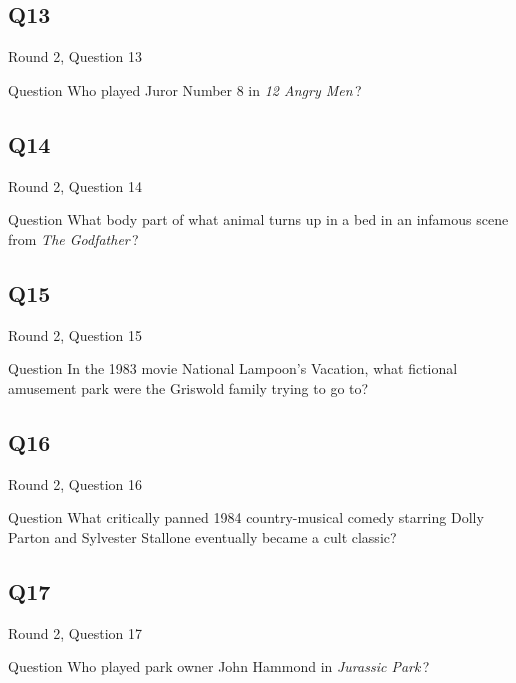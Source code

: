 \documentclass[11pt]{beamer}
\begin{document}
\subsection*{Q13}
\begin{frame}[t]{Round 2, Question 13}
\vspace{2em}
\begin{block}{Question}
Who played Juror Number 8 in \emph{12 Angry Men}\,?
\end{block}
\end{frame}
    

\subsection*{Q14}
\begin{frame}[t]{Round 2, Question 14}
\vspace{2em}
\begin{block}{Question}
What body part of what animal turns up in a bed in an infamous scene from \emph{The Godfather}\,?
\end{block}
\end{frame}
    

\subsection*{Q15}
\begin{frame}[t]{Round 2, Question 15}
\vspace{2em}
\begin{block}{Question}
In the 1983 movie National Lampoon's Vacation, what fictional amusement park were the Griswold family trying to go to?
\end{block}
\end{frame}
    

\subsection*{Q16}
\begin{frame}[t]{Round 2, Question 16}
\vspace{2em}
\begin{block}{Question}
What critically panned 1984 country-musical comedy starring Dolly Parton and Sylvester Stallone eventually became a cult classic?
\end{block}
\end{frame}
    

\subsection*{Q17}
\begin{frame}[t]{Round 2, Question 17}
\vspace{2em}
\begin{block}{Question}
Who played park owner John Hammond in \emph{Jurassic Park}\,?
\end{block}
\end{frame}
    
\end{document}
